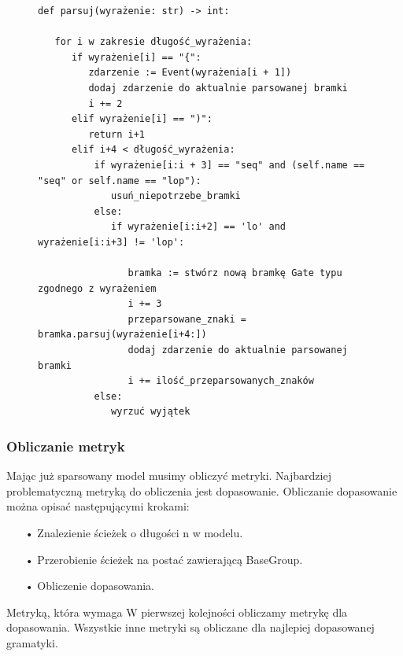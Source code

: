 \begin{figure}[!ht]
\lstset{caption=Parser gramatyki, captionpos=b}
\lstset{label=src:passive, frame=single}
\begin{lstlisting}
def parsuj(wyrażenie: str) -> int:

   for i w zakresie długość_wyrażenia:
      if wyrażenie[i] == "{":
         zdarzenie := Event(wyrażenia[i + 1])
         dodaj zdarzenie do aktualnie parsowanej bramki 
         i += 2
      elif wyrażenie[i] == ")":
         return i+1
      elif i+4 < długość_wyrażenia:
          if wyrażenie[i:i + 3] == "seq" and (self.name == "seq" or self.name == "lop"):
             usuń_niepotrzebe_bramki
          else:
             if wyrażenie[i:i+2] == 'lo' and wyrażenie[i:i+3] != 'lop':
                    
                bramka := stwórz nową bramkę Gate typu zgodnego z wyrażeniem 
                i += 3
                przeparsowane_znaki = bramka.parsuj(wyrażenie[i+4:])
                dodaj zdarzenie do aktualnie parsowanej bramki 
                i += ilość_przeparsowanych_znaków
          else:
             wyrzuć wyjątek
\end{lstlisting}
\end{figure}

\subsubsection{Obliczanie metryk}
Mając już sparsowany model musimy obliczyć metryki. Najbardziej problematyczną metryką do obliczenia jest dopasowanie. Obliczanie dopasowanie można opisać następującymi krokami:
\begin{itemize}
  \item[•] Znalezienie ścieżek o długości n w modelu.
  \item[•] Przerobienie ścieżek na postać zawierającą BaseGroup.
  \item[•] Obliczenie dopasowania.
\end{itemize}
Metryką, która wymaga 
W pierwszej kolejności obliczamy metrykę dla dopasowania. Wszystkie inne metryki są obliczane dla najlepiej dopasowanej gramatyki.
 
